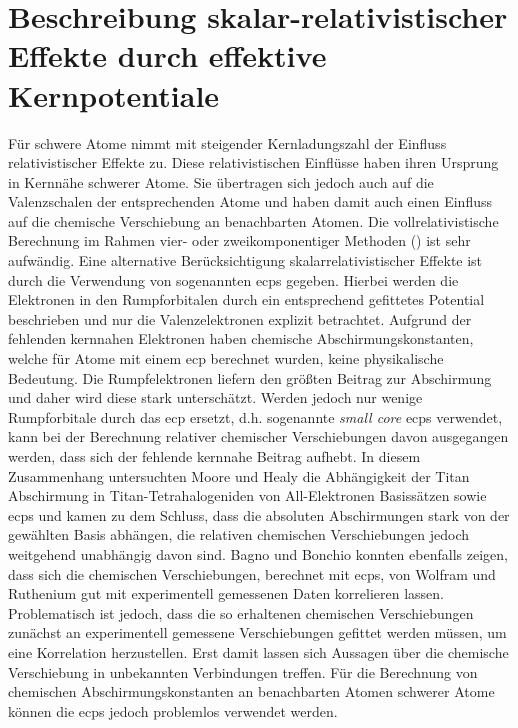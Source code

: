 \section{Beschreibung skalar-relativistischer Effekte durch effektive Kernpotentiale}\label{kap:ecps}
Für schwere Atome nimmt mit steigender Kernladungszahl der Einfluss relativistischer Effekte zu. Diese relativistischen Einflüsse haben ihren Ursprung in Kernnähe schwerer Atome. Sie übertragen sich jedoch auch auf die Valenzschalen der entsprechenden Atome und haben damit auch einen Einfluss auf die chemische Verschiebung an benachbarten Atomen. Die vollrelativistische Berechnung im Rahmen vier- oder zweikomponentiger Methoden () ist sehr aufwändig. Eine alternative Berücksichtigung skalarrelativistischer Effekte ist durch die Verwendung von sogenannten \acfp{ecp}\supercite{cundari1996effective,frenking2007pseudopotential} gegeben. Hierbei werden die Elektronen in den Rumpforbitalen durch ein entsprechend gefittetes Potential beschrieben und nur die Valenzelektronen explizit betrachtet. Aufgrund der fehlenden kernnahen Elektronen haben chemische Abschirmungskonstanten, welche für Atome mit einem \ac{ecp} berechnet wurden, keine physikalische Bedeutung. Die Rumpfelektronen liefern den größten Beitrag zur Abschirmung und daher wird diese stark unterschätzt. Werden jedoch nur wenige Rumpforbitale durch das \ac{ecp} ersetzt, d.h. sogenannte \textit{small core} \acp{ecp} verwendet, kann bei der Berechnung relativer chemischer Verschiebungen davon ausgegangen werden, dass sich der fehlende kernnahe Beitrag aufhebt.\supercite{van2012use} In diesem Zusammenhang untersuchten Moore und Healy\supercite{moore1995ab} die Abhängigkeit der Titan Abschirmung in Titan-Tetrahalogeniden von All-Elektronen Basissätzen sowie \acp{ecp} und kamen zu dem Schluss, dass die absoluten Abschirmungen stark von der gewählten Basis abhängen, die relativen chemischen Verschiebungen jedoch weitgehend unabhängig davon sind. Bagno und Bonchio konnten ebenfalls zeigen, dass sich die chemischen Verschiebungen, berechnet mit \acp{ecp}, von Wolfram\supercite{bagno2000effective} und Ruthenium\supercite{bagno2002dft} gut mit experimentell gemessenen Daten korrelieren lassen. Problematisch ist jedoch, dass die so erhaltenen chemischen Verschiebungen zunächst an experimentell gemessene Verschiebungen gefittet werden müssen, um eine Korrelation herzustellen. Erst damit lassen sich Aussagen über die chemische Verschiebung in unbekannten Verbindungen treffen. Für die Berechnung von chemischen Abschirmungskonstanten an benachbarten Atomen schwerer Atome können die \acp{ecp} jedoch problemlos verwendet werden.
